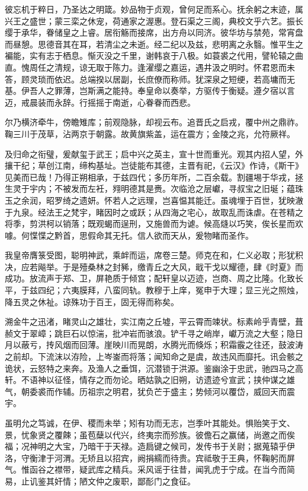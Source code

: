\documentclass[12pt,UTF8]{ctexbook}
\begin{document}
彼忘机于粹日，乃圣达之明箴。妙品物于贞观，曾何足而系心。抚余躬之末迹，属兴王之盛世；蒙三栾之休宠，荷通家之渥惠。登石渠之三阁，典校文乎六艺。振长缨于承华，眷储皇之上睿。居衔觞而接席，出方舟以同济。彼华坊与禁苑，常宵盘而昼憩。思德音其在耳，若清尘之未逝。经二纪以及兹，悲明离之永翳。惟平生之褊能，实有志于栖息。惭灭没之千里，谢韩哀于八极。如蓑裘之代用，譬轮辕之曲直。愧周任之清规，谅无取于陈力。逢濯缨之嘉运，遇井汲之明时。怀君恩而未答，顾灵琐而依迟。总端揆以居副，长庶僚而称师。犹深泉之短绠，若高墉而无基。伊吾人之罪薄，岂斯满之能持。奉皇命以奏举，方驱传于衡疑。遵夕宿以言迈，戒晨装而永辞。行摇摇于南逝，心眷眷而西悲。

尔乃横济牵牛，傍瞻雉库；前观隐脉，却视云布。追晋氏之启戎，覆中州之鼎祚。鞠三川于茂草，沾两京于朝露。故黄旗紫盖，运在震方；金陵之兆，允符厥祥。

及归命之衔璧，爰献玺于武王；启中兴之英主，宣十世而重光。观其内招人望，外攘干纪；草创江南，缔构基址。岂徒能布其德，主晋有祀，《云汉》作诗，《斯干》见美而已哉！乃得正朔相承，于兹四代；多历年所，二百余载。割疆埸于华戎，拯生灵于宇内；不被发而左衽，翙明德其是赉。次临沧之层巘，寻叔宝之旧埏；蕴珠玉之余润，昭罗绮之遗妍。怀若人之远理，岂喜愠其能迁。虽魂埋于百世，犹映澈于九泉。经法王之梵宇，睹因时之或跃；从四海之宅心，故取乱而诛虐。在苍精之将季，剪洪柯以销落；既观蝎而逞刑，又施兽而为谑。候高熢以巧笑，俟长星而欢噱。何惵惵之黔首，思假命其无托。信人欲而天从，爰物睹而圣作。

我皇帝膺箓受图，聪明神武，乘衅而运，席卷三楚。师克在和，仁义必取；形犹积决，应若飚举。于是殪桑林之封豨，缴青丘之大风，戢干戈以耀德，肆《时夏》而成功。放流声于郑、卫，屏艳质于倾宫；配轩皇以迈迹，岂商、周之比隆。化致长平，于兹四纪；六夷膜拜，八蛮同轨。教穆于上庠，冤申于大理；显三光之照烛，降五灵之休祉。谅殊功于百王，固无得而称矣。

溯金牛之迅渚，睹灵山之雄壮，实江南之丘墟，平云霄而竦状。标素岭乎青壁，葺赪文于翠嶂；跳巨石以惊湍，批冲岩而骇浪。铲千寻之峭岸，巘万流之大壑；隐日月以蔽亏，抟风烟而回薄。崖映川而晃朗，水腾光而倏烁；积霜霰之往还，鼓波涛之前却。下流沫以洊险，上岑崟而将落；闻知命之是虞，故违风而靡托。讯会骸之诡状，云怒特之来奔。及渔人之垂饵，沉潜锁于洪源。鉴幽涂于忠武，驰四马之高轩。不语神以征怪，情存之而勿论。晒姑孰之旧朔，访遗迹兮宣武；挟仲谋之雄气，朝委裘而作辅。历祖宗之明君，犹负芒于盛主；势倾河以覆岱，威回天而震宇。

虽明允之笃诚，在伊、稷而未举；矧有功而无志，岂季叶其能处。惧贻笑于文、景，忧象贤之覆餗；虽苞蘖以代兴，终夷宗而殄族。彼儋石之赢储，尚邀之而俟福；况神明之大宝，乃暗干于天禄。造扃键之候司，发传书于关尉；据蒐辕乎伊洛，守衡津于河渭。无矫且以招宾，阙捐繻而待贵。宾祗敬于王典，怀鞠躬而屏气。惟函谷之襟带，疑武库之精兵。采风谣于往昔，闻乳虎于宁成。在当今而简易，止讥鉴其奸情；陋文仲之废职，鄙耏门之食征。
\end{document}
